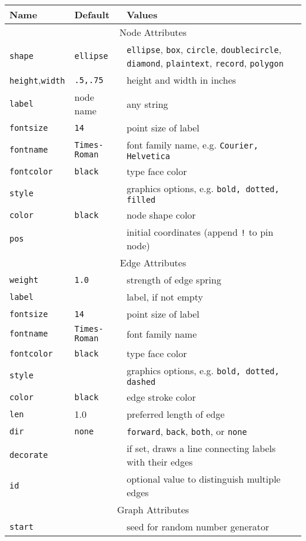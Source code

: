 \documentclass[11pt]{article}
\begin{document}
\begin{table}
\begin{tabular}[t]{|l|l|p{3.5in}|} \hline
Name & Default & \hfil Values \hfil \\ \hline
\multicolumn{3}{|c|}{Node Attributes} \\ \hline
{\tt shape} & {\tt ellipse} & {\tt ellipse}, {\tt box}, {\tt circle}, {\tt doublecircle}, {\tt diamond}, {\tt plaintext}, {\tt record}, {\tt polygon} \\
{\tt height},{\tt width} & {\tt .5,.75} & height and width in inches \\
{\tt label} & node name & any string \\
{\tt fontsize} & {\tt 14} & point size of label \\
{\tt fontname} & {\tt Times-Roman} & font family name, e.g. {\tt Courier, Helvetica} \\
{\tt fontcolor} & {\tt black} & type face color \\
{\tt style} & & graphics options, e.g. {\tt bold, dotted, filled} \\ 
{\tt color} & {\tt black} & node shape color \\ 
{\tt pos} & & initial coordinates (append {\tt !} to pin node) \\ \hline
\multicolumn{3}{|c|}{Edge Attributes}   \\ \hline
{\tt weight} & {\tt 1.0} & strength of edge spring \\
{\tt label} & & label, if not empty \\
{\tt fontsize} & {\tt 14} & point size of label \\
{\tt fontname} & {\tt Times-Roman} & font family name \\
{\tt fontcolor} & {\tt black} & type face color \\
{\tt style} & & graphics options, e.g. {\tt bold, dotted, dashed} \\ 
{\tt color} & {\tt black} & edge stroke color \\
{\tt len} & 1.0 & preferred length of edge \\
{\tt dir} & {\tt none} & {\tt forward}, {\tt back}, {\tt both}, or {\tt none} \\ 
{\tt decorate} & & if set, draws a line connecting labels with their edges \\
{\tt id} & & optional value to distinguish multiple edges \\ \hline
\multicolumn{3}{|c|}{Graph Attributes}  \\ \hline
{\tt start} & & seed for random number generator \\

\end{tabular}
\end{table}
\end{document}

